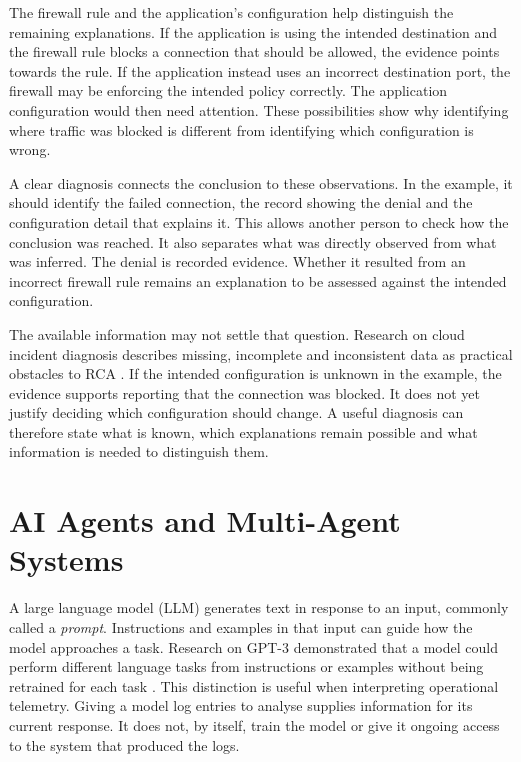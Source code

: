 The firewall rule and the application's configuration help distinguish
the remaining explanations. If the application is using the intended
destination and the firewall rule blocks a connection that should be
allowed, the evidence points towards the rule. If the application instead
uses an incorrect destination port, the firewall may be enforcing the
intended policy correctly. The application configuration would then need
attention. These possibilities show why identifying where traffic was
blocked is different from identifying which configuration is wrong.

A clear diagnosis connects the conclusion to these observations. In the
example, it should identify the failed connection, the record showing the
denial and the configuration detail that explains it. This allows another
person to check how the conclusion was reached. It also separates what
was directly observed from what was inferred. The denial is recorded
evidence. Whether it resulted from an incorrect firewall rule remains
an explanation to be assessed against the intended configuration.

The available information may not settle that question. Research on
cloud incident diagnosis describes missing, incomplete and inconsistent
data as practical obstacles to RCA \parencite{chen2024rcacopilot}.
If the intended configuration is unknown in the example, the evidence
supports reporting that the connection was blocked. It does not yet
justify deciding which configuration should change. A useful diagnosis
can therefore state what is known, which explanations remain possible
and what information is needed to distinguish them.


\section{AI Agents and Multi-Agent Systems}
\label{sec:background:agents}

A large language model (LLM) generates text in response to an input,
commonly called a \emph{prompt}. Instructions and examples in that input
can guide how the model approaches a task. Research on GPT-3 demonstrated
that a model could perform different language tasks from instructions or
examples without being retrained for each task
\parencite{brown2020fewshot}. This distinction is useful when interpreting
operational telemetry. Giving a model log entries to analyse supplies
information for its current response. It does not, by itself, train the
model or give it ongoing access to the system that produced the logs.

